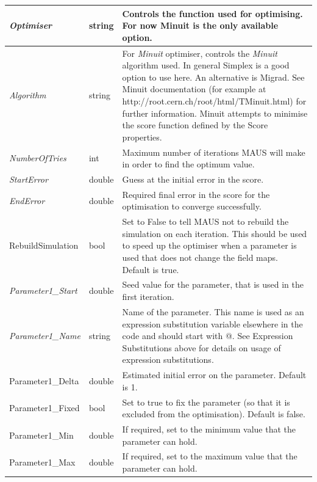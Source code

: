 \begin{center}
\tabletail{}
\tablelasttail{}
\begin{supertabular}{|m{3.319cm}|m{1.2019999cm}|m{11.974cm}|}
\hline
{\itshape Optimiser} &
string &
Controls the function used for optimising. For now Minuit is the only available option.\\\hline
{\itshape Algorithm} &
string &
For \textit{Minuit} optimiser, controls the \textit{Minuit} algorithm used. In general Simplex is a good option to use
here. An alternative is Migrad. See Minuit documentation (for example at http://root.cern.ch/root/html/TMinuit.html)
for further information. Minuit attempts to minimise the score function defined by the Score properties.\\\hline
{\itshape NumberOfTries} &
int &
Maximum number of iterations MAUS will make in order to find the optimum value.\\\hline
{\itshape StartError} &
double &
Guess at the initial error in the score.\\\hline
{\itshape EndError} &
double &
Required final error in the score for the optimisation to converge successfully.\\\hline
RebuildSimulation &
bool &
Set to False to tell MAUS not to rebuild the simulation on each iteration. This should be used to speed up the
optimiser when a parameter is used that does not change the field maps. Default is true.\\\hline
{\itshape Parameter1\_Start} &
double &
Seed value for the parameter, that is used in the first iteration.\\\hline
{\itshape Parameter1\_Name} &
string &
Name of the parameter. This name is used as an expression substitution variable elsewhere in the code and should start
with @. See Expression Substitutions above for details on usage of expression substitutions.\\\hline
Parameter1\_Delta &
double &
Estimated initial error on the parameter. Default is 1.\\\hline
Parameter1\_Fixed &
bool &
Set to true to fix the parameter (so that it is excluded from the optimisation). Default is false.\\\hline
Parameter1\_Min &
double &
If required, set to the minimum value that the parameter can hold.\\\hline
Parameter1\_Max &
double &
If required, set to the maximum value that the parameter can hold.\\\hline


\end{supertabular}
\end{center}
